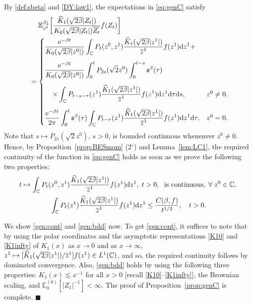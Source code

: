 \documentclass[12pt, twoside]{article}
\numberwithin{figure}{section}
\newcommand{\less}{\lesssim}
\newcommand{\e}{{\mathrm e}}
\newcommand{\1}{\mathds 1}
\newcommand{\da}{{\downarrow}}
\newcommand{\E}{{\mathbb E}}
\renewcommand{\d}{{\mathrm d}}
\newcommand{\2}{{\mathbf 1}}
\newcommand{\s}{{\mathfrak s}}
\renewenvironment{proof}[1][\proofname]{\noindent {\bfseries #1.}\;}{\hfill\ensuremath{\blacksquare}\\}
\newcommand{\cc}{{^\circ}}
\newcommand{\hK}{{\widehat{K}}}
\newcommand{\two}{{\sqrt{2}}}
\begin{document}
\begin{proof}[Proof of Proposition~\ref{prop:genC}]
By \eqref{def:sbeta} and \eqref{DY:law1}, the expectations in \eqref{eq:genC} satisfy 
\begin{align*}
&\quad\;\E^{\beta\da}_{z^0}\biggl[\frac{\hK_1(\sqrt{2\beta}|Z_t|)}{K_0(\sqrt{2\beta}|Z_t|)\overline{Z_t}}f(Z_t)\biggr]\\
&=
\begin{cases}
\displaystyle \frac{\e^{-\beta t}}{K_0(\sqrt{2\beta}|z^0|)}
\int_{\Bbb C}P_t(z^0,z^1)\frac{\hK_1(\sqrt{2\beta}|z^1|)}{\overline{z}^1}f(z^1)\d z^1
+\\
\vspace{-.2cm}\\
\displaystyle \hspace{0cm}\frac{\e^{-\beta t}}{K_0(\sqrt{2\beta}|z^0|)}\int_0^t P_{2s}(\two z^0)\int_0^{t-s}\s^\beta(\tau)\\
\vspace{-.2cm}\\
 \displaystyle \hspace{.4cm}\times \int_{\Bbb C} P_{t-s-\tau}(z^1)\frac{\hK_1(\sqrt{2\beta}|z^1|)}{\overline{z}^1}f(z^1)\d z^1\d \tau\d s, &z^0\neq 0,\\
\vspace{-.2cm}\\
\displaystyle \frac{\e^{-\beta t}}{2\pi}\int_0^t  \s^\beta(\tau) \int_{\Bbb C}P_{t-\tau}(z^1)\frac{\hK_1(\sqrt{2\beta}|z^1|)}{\overline{z}^1}f(z^1)\d z^1\d \tau,&z^0=0.
\end{cases}
\end{align*}
Note that $s\mapsto P_{2s}(\two z^0)$, $s>0$, is bounded continuous whenenver $z^0\neq 0$. Hence, by Proposition~\ref{prop:BESmom} (2$\cc$) and Lemma~\ref{lem:LC1}, the required continuity of the function in \eqref{eq:genC} holds as soon as we prove the following two properties:
\begin{gather}
 t\mapsto \int_{\Bbb C}P_t(z^0,z^1)\frac{\hK_1(\sqrt{2\beta}|z^1|)}{\overline{z}^1}f(z^1)\d z^1 ,\; t>0,\;\mbox{ is continuous},\;\forall\;z^0\in \Bbb C,\;\label{gen:cont}\\
 \int_{\Bbb C}P_t(z^1)\frac{\hK_1(\sqrt{2\beta}|z^1|)}{\overline{z}^1}f(z^1)\d z^1 \leq \frac{C(\beta,f)}{t^{1/2}},\quad t>0.\label{gen:bdd}
\end{gather}

We show \eqref{gen:cont} and \eqref{gen:bdd} now. 
To get \eqref{gen:cont}, it suffices to note that by using the polar coordinates and the asymptotic representations \eqref{K10} and \eqref{K1infty} of $K_1(x)$ as $x\to 0$ and as $x\to\infty$, 
 $z^1\mapsto [\widehat{K}_1(\sqrt{2\beta}|z^1|)/\overline{z}^1]f(z^1)\in L^1(\Bbb C)$, and so, the required continuity follows by dominated convergence. Also, \eqref{gen:bdd} holds by using the following three properties: $K_1(x)\less x^{-1}$ for all $x>0$ [recall \eqref{K10}--\eqref{K1infty}], the Brownian scaling, and $\E^{(0)}_{0}[|Z_1|^{-1}]<\infty$. The proof of Proposition~\ref{prop:genC} is complete.
\end{proof}
\end{document}
